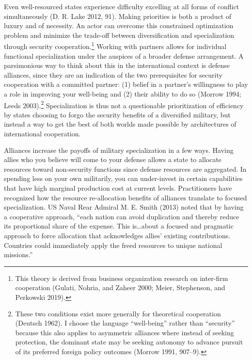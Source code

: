 \documentclass[
  12,
  letterpaper,
  DIV=11,
  numbers=noendperiod]{scrartcl}
\begin{document}
Even well-resourced states experience difficulty excelling at all forms
of conflict simultaneously (D. R. Lake 2012, 91). Making priorities is
both a product of luxury and of necessity. An actor can overcome this
constrained optimization problem and minimize the trade-off between
diversification and specialization through security
cooperation.\footnote{This theory is derived from business organization
  research on inter-firm cooperation (Gulati, Nohria, and Zaheer 2000;
  Meier, Stephenson, and Perkowski 2019).} Working with partners allows
for individual functional specialization under the auspices of a broader
defense arrangement. A parsimonious way to think about this in the
international context is defense alliances, since they are an indication
of the two prerequisites for security cooperation with a committed
partner: (1) belief in a partner's willingness to play a role in
improving your well-being and (2) their ability to do so (Morrow 1994;
Leeds 2003).\footnote{These two conditions exist more generally for
  theoretical cooperation (Deutsch 1962). I choose the language
  ``well-being'' rather than ``security'' because this also applies to
  asymmetric alliances where instead of seeking protection, the dominant
  state may be seeking autonomy to advance pursuit of its preferred
  foreign policy outcomes (Morrow 1991, 907--9).} Specialization is thus
not a questionable prioritization of efficiency by states choosing to
forgo the security benefits of a diversified military, but instead a way
to get the best of both worlds made possible by architectures of
international cooperation.

Alliances increase the payoffs of military specialization in a few ways.
Having allies who you believe will come to your defense allows a state
to allocate resources toward non-security functions since defense
resources are aggregated. In spending less on your own militarily, you
can under-invest in certain capabilities that have high marginal
production cost at current levels. Practitioners have recognized how the
resource re-allocation benefits of alliances translate to focused
specialization. US Naval Rear Admiral M. E. Smith (2013) noted that by
having a cooperative approach, ``each nation can avoid duplication and
thereby reduce its proportional share of the expense. This
is\ldots about a focused and pragmatic approach to force allocation that
acknowledges allies' existing contributions. Countries could immediately
apply the freed resources to unique national missions.''
\end{document}
